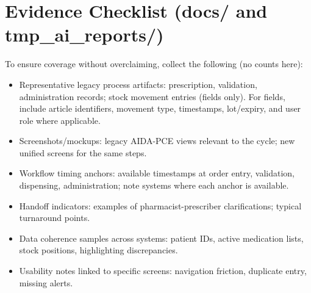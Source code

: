 \section{Evidence Checklist (docs/ and tmp\_ai\_reports/)}
\begingroup\sloppy
To ensure coverage without overclaiming, collect the following (no counts here):
\begin{itemize}
    \item Representative legacy process artifacts: prescription, validation, administration records; stock movement entries (fields only). For fields, include article identifiers, movement type, timestamps, lot/expiry, and user role where applicable.
    \item Screenshots/mockups: legacy AIDA-PCE views relevant to the cycle; new unified screens for the same steps.
    \item Workflow timing anchors: available timestamps at order entry, validation, dispensing, administration; note systems where each anchor is available.
    \item Handoff indicators: examples of pharmacist-prescriber clarifications; typical turnaround points.
    \item Data coherence samples across systems: patient IDs, active medication lists, stock positions, highlighting discrepancies.
    \item Usability notes linked to specific screens: navigation friction, duplicate entry, missing alerts.
\end{itemize}
\endgroup

